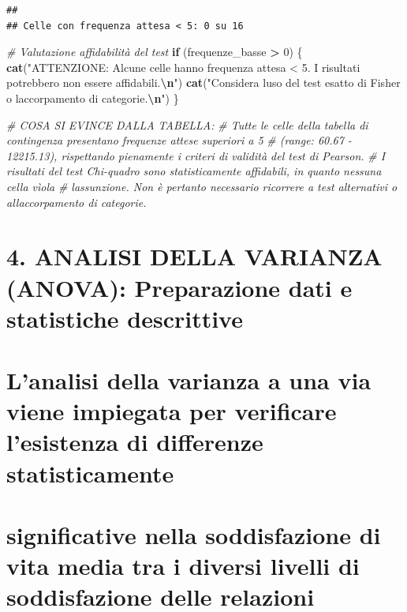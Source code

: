 \documentclass[
]{article}
\newenvironment{Shaded}{\begin{snugshade}}{\end{snugshade}}
\newcommand{\CommentTok}[1]{\textcolor[rgb]{0.56,0.35,0.01}{\textit{#1}}}
\newcommand{\ControlFlowTok}[1]{\textcolor[rgb]{0.13,0.29,0.53}{\textbf{#1}}}
\newcommand{\DecValTok}[1]{\textcolor[rgb]{0.00,0.00,0.81}{#1}}
\newcommand{\FunctionTok}[1]{\textcolor[rgb]{0.13,0.29,0.53}{\textbf{#1}}}
\newcommand{\NormalTok}[1]{#1}
\newcommand{\SpecialCharTok}[1]{\textcolor[rgb]{0.81,0.36,0.00}{\textbf{#1}}}
\newcommand{\StringTok}[1]{\textcolor[rgb]{0.31,0.60,0.02}{#1}}
\begin{document}
\begin{verbatim}
## 
## Celle con frequenza attesa < 5: 0 su 16
\end{verbatim}

\begin{Shaded}
\begin{Highlighting}[]
\CommentTok{\# Valutazione affidabilità del test}
\ControlFlowTok{if}\NormalTok{ (frequenze\_basse }\SpecialCharTok{\textgreater{}} \DecValTok{0}\NormalTok{) \{}
  \FunctionTok{cat}\NormalTok{(}\StringTok{"ATTENZIONE: Alcune celle hanno frequenza attesa \textless{} 5. I risultati potrebbero non essere affidabili.}\SpecialCharTok{\textbackslash{}n}\StringTok{"}\NormalTok{)}
  \FunctionTok{cat}\NormalTok{(}\StringTok{"Considera l\textquotesingle{}uso del test esatto di Fisher o l\textquotesingle{}accorpamento di categorie.}\SpecialCharTok{\textbackslash{}n}\StringTok{"}\NormalTok{)}
\NormalTok{\}}

\CommentTok{\# COSA SI EVINCE DALLA TABELLA:}
\CommentTok{\# Tutte le celle della tabella di contingenza presentano frequenze attese superiori a 5 }
\CommentTok{\# (range: 60.67 {-} 12215.13), rispettando pienamente i criteri di validità del test di Pearson. }
\CommentTok{\# I risultati del test Chi{-}quadro sono statisticamente affidabili, in quanto nessuna cella vìola}
\CommentTok{\# l\textquotesingle{}assunzione. Non è pertanto necessario ricorrere a test alternativi o all\textquotesingle{}accorpamento di categorie.}
\end{Highlighting}
\end{Shaded}

\section{4. ANALISI DELLA VARIANZA (ANOVA): Preparazione dati e
statistiche
descrittive}\label{analisi-della-varianza-anova-preparazione-dati-e-statistiche-descrittive}

\section{L'analisi della varianza a una via viene impiegata per
verificare l'esistenza di differenze
statisticamente}\label{lanalisi-della-varianza-a-una-via-viene-impiegata-per-verificare-lesistenza-di-differenze-statisticamente}

\section{significative nella soddisfazione di vita media tra i diversi
livelli di soddisfazione delle
relazioni}\label{significative-nella-soddisfazione-di-vita-media-tra-i-diversi-livelli-di-soddisfazione-delle-relazioni}
\end{document}
